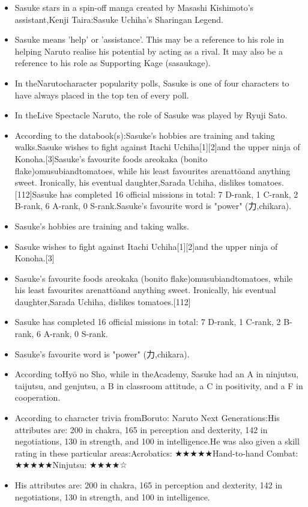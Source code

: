 \documentclass[a4paper,12pt]{article}
\begin{document}
\begin{itemize}
\item Sasuke stars in a spin-off manga created by Masashi Kishimoto's assistant,Kenji Taira:Sasuke Uchiha's Sharingan Legend.
\item Sasuke means 'help' or 'assistance'. This may be a reference to his role in helping Naruto realise his potential by acting as a rival. It may also be a reference to his role as Supporting Kage (sasaukage).
\item In theNarutocharacter popularity polls, Sasuke is one of four characters to have always placed in the top ten of every poll.
\item In theLive Spectacle Naruto, the role of Sasuke was played by Ryuji Sato.
\item According to the databook(s):Sasuke's hobbies are training and taking walks.Sasuke wishes to fight against Itachi Uchiha[1][2]and the upper ninja of Konoha.[3]Sasuke's favourite foods areokaka (bonito flake)omusubiandtomatoes, while his least favourites arenattōand anything sweet. Ironically, his eventual daughter,Sarada Uchiha, dislikes tomatoes.[112]Sasuke has completed 16 official missions in total: 7 D-rank, 1 C-rank, 2 B-rank, 6 A-rank, 0 S-rank.Sasuke's favourite word is "power" (力,chikara).
\item Sasuke's hobbies are training and taking walks.
\item Sasuke wishes to fight against Itachi Uchiha[1][2]and the upper ninja of Konoha.[3]
\item Sasuke's favourite foods areokaka (bonito flake)omusubiandtomatoes, while his least favourites arenattōand anything sweet. Ironically, his eventual daughter,Sarada Uchiha, dislikes tomatoes.[112]
\item Sasuke has completed 16 official missions in total: 7 D-rank, 1 C-rank, 2 B-rank, 6 A-rank, 0 S-rank.
\item Sasuke's favourite word is "power" (力,chikara).
\item According toHyō no Sho, while in theAcademy, Sasuke had an A in ninjutsu, taijutsu, and genjutsu, a B in classroom attitude, a C in positivity, and a F in cooperation.
\item According to character trivia fromBoruto: Naruto Next Generations:His attributes are: 200 in chakra, 165 in perception and dexterity, 142 in negotiations, 130 in strength, and 100 in intelligence.He was also given a skill rating in these particular areas:Acrobatics: ★★★★★Hand-to-hand Combat: ★★★★★Ninjutsu: ★★★★☆
\item His attributes are: 200 in chakra, 165 in perception and dexterity, 142 in negotiations, 130 in strength, and 100 in intelligence.

\end{itemize}
\end{document}
